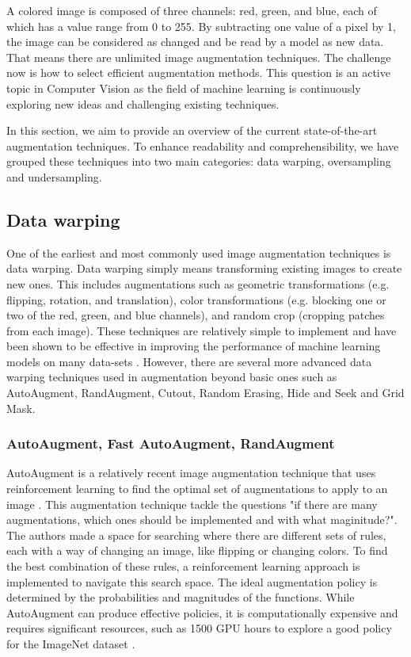 A colored image is composed of three channels: red, green, and blue, each of which has a value range from 0 to 255. By subtracting one value of a pixel by 1, the image can be considered as changed and be read by a model as new data. That means there are unlimited image augmentation techniques. The challenge now is how to select efficient augmentation methods. This question is  an active topic in Computer Vision as the field of machine learning is continuously exploring new ideas and challenging existing techniques. 

In this section, we aim to provide an overview of the current state-of-the-art augmentation techniques. To enhance readability and comprehensibility, we have grouped these techniques into two main categories: data warping, oversampling and undersampling.

\subsection{Data warping}
One of the earliest and most commonly used image augmentation techniques is data warping. Data warping simply means transforming existing images to create new ones. This includes augmentations such as geometric transformations (e.g. flipping, rotation, and translation), color transformations (e.g. blocking one or two of the red, green, and blue channels), and random crop (cropping patches from each image). These techniques are relatively simple to implement and have been shown to be effective in improving the performance of machine learning models on many data-sets \cite{shorten2019survey}. However, there are several more advanced data warping techniques used in augmentation beyond basic ones such as AutoAugment, RandAugment, Cutout, Random Erasing, Hide and Seek and Grid Mask.

\subsubsection{AutoAugment, Fast AutoAugment, RandAugment}
AutoAugment is a relatively recent image augmentation technique that uses reinforcement learning to find the optimal set of augmentations to apply to an image \cite{cubuk2018autoaugment}. This augmentation technique tackle the questions "if there are many augmentations, which ones should be implemented and with what maginitude?". The authors made a space for searching where there are different sets of rules, each with a way of changing an image, like flipping or changing colors. To find the best combination of these rules, a reinforcement learning approach is implemented to navigate this search space. The ideal augmentation policy is determined by the probabilities and magnitudes of the functions. While AutoAugment can produce effective policies, it is computationally expensive and requires significant resources, such as 1500 GPU hours to explore a good policy for the ImageNet dataset \cite{lim2019fast}.

